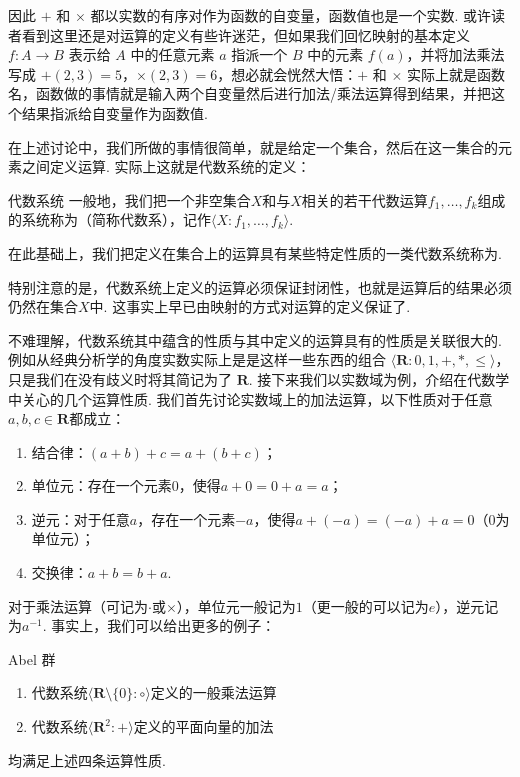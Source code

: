 因此 $+$ 和 $\times$ 都以实数的有序对作为函数的自变量，函数值也是一个实数. 或许读者看到这里还是对运算的定义有些许迷茫，但如果我们回忆映射的基本定义 $f \colon A \to B$ 表示给 $A$ 中的任意元素 $a$ 指派一个 $B$ 中的元素 $f(a)$，并将加法乘法写成 $+(2,3) = 5$，$\times(2,3) = 6$，想必就会恍然大悟：$+$ 和 $\times$ 实际上就是函数名，函数做的事情就是输入两个自变量然后进行加法/乘法运算得到结果，并把这个结果指派给自变量作为函数值.

在上述讨论中，我们所做的事情很简单，就是给定一个集合，然后在这一集合的元素之间定义运算. 实际上这就是代数系统的定义：
\begin{definition}{代数系统}{} 
    一般地，我们把一个非空集合$X$和与$X$相关的若干代数运算$f_1,\ldots,f_k$组成的系统称为（简称代数系），记作$\langle X \colon f_1,\ldots,f_k\rangle$.

    在此基础上，我们把定义在集合上的运算具有某些特定性质的一类代数系统称为.
\end{definition}

特别注意的是，代数系统上定义的运算必须保证封闭性，也就是运算后的结果必须仍然在集合$X$中. 这事实上早已由映射的方式对运算的定义保证了.

不难理解，代数系统其中蕴含的性质与其中定义的运算具有的性质是关联很大的. 例如从经典分析学的角度实数实际上是是这样一些东西的组合 $\langle\mathbf{R}\colon 0, 1, +, *, \leqslant\rangle$，只是我们在没有歧义时将其简记为了 $\mathbf{R}$. 接下来我们以实数域为例，介绍在代数学中关心的几个运算性质. 我们首先讨论实数域上的加法运算，以下性质对于任意$a,b,c\in\mathbf{R}$都成立：

\begin{enumerate}
    \item 结合律：$(a+b)+c=a+(b+c)$；

    \item 单位元：存在一个元素$0$，使得$a+0=0+a=a$；

    \item 逆元：对于任意$a$，存在一个元素$-a$，使得$a+(-a)=(-a)+a=0$（0为单位元）；

    \item 交换律：$a+b=b+a$.
\end{enumerate}

对于乘法运算（可记为$\cdot$或$\times$），单位元一般记为$1$（更一般的可以记为$e$），逆元记为$a^{-1}$. 事实上，我们可以给出更多的例子：
\begin{example}{}{Abel 群}
    \begin{enumerate}
        \item 代数系统$\langle \mathbf{R}\setminus\{0\}\colon\circ\rangle$定义的一般乘法运算

        \item 代数系统$\langle \mathbf{R}^2\colon+\rangle$定义的平面向量的加法
    \end{enumerate}
    均满足上述四条运算性质.
\end{example}


